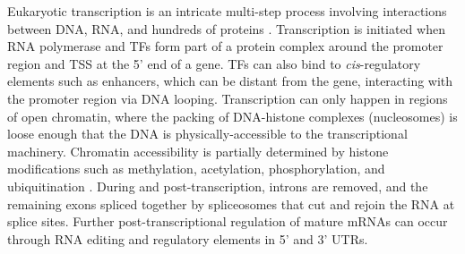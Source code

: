 \begin{outline}
Eukaryotic transcription is an intricate multi-step process involving interactions between DNA, RNA, and hundreds of proteins \autocite{cramer2019OrganizationRegulationGene}.
Transcription is initiated when RNA polymerase and \glspl{TF} form part of a protein complex around the promoter region and \gls{TSS} at the 5' end of a gene.
\Glspl{TF} can also bind to \textit{cis}-regulatory elements such as enhancers,
which can be distant from the gene, interacting with the promoter region via DNA looping.
Transcription can only happen in regions of open chromatin, where the packing of DNA-histone complexes (nucleosomes) is loose enough that the DNA is physically-accessible to the transcriptional machinery.
Chromatin accessibility is partially determined by histone modifications such as methylation, acetylation, phosphorylation, and ubiquitination \autocite{bannister2011RegulationChromatinHistone}.
During and post-transcription, introns are removed, and the remaining exons spliced together by spliceosomes that cut and rejoin the RNA at splice sites.
Further post-transcriptional regulation of mature \glspl{mRNA} can occur through RNA editing and regulatory elements in 5' and 3' \glspl{UTR}.


\end{outline}

